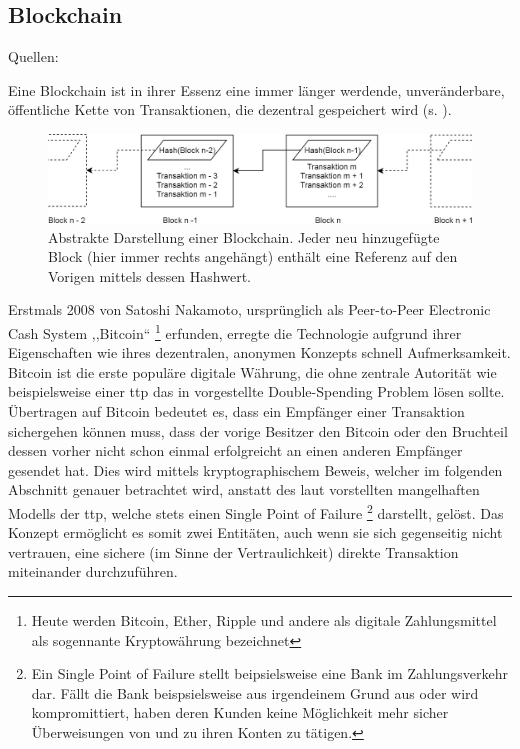 \subsection{Blockchain}
\label{sec:sota_blockchain}

    {\footnotesize Quellen: \cite{Dorri2016}\cite{Conoscenti2016}\cite{Greenspan2015}\cite{ISO307}\cite{Kshetri2017}\cite{Nakamoto2008}\cite{Underwood2016}\cite{Vukolic2016}\cite{Vukolic2017}\cite{Wuest2017}\cite{Zheng2017}}
    
    Eine Blockchain ist in ihrer Essenz eine immer länger werdende, unveränderbare, öffentliche Kette von Transaktionen, die dezentral gespeichert wird (s. ). 
    \smallskip
    \begin{figure}[H]
    	\centering
    	\includegraphics[width=\textwidth]{graphics/bc_highlvl.png}
    	\caption[Abstrakte Darstellung einer Blockchain]{Abstrakte Darstellung einer Blockchain. Jeder neu hinzugefügte Block (hier immer rechts angehängt) enthält eine Referenz auf den Vorigen mittels dessen Hashwert.}
    	\label{fig:bc_highlvl}
    \end{figure}
    \noindent Erstmals 2008 von Satoshi Nakamoto, ursprünglich als Peer-to-Peer Electronic Cash System ,,Bitcoin``
    \!\footnote{Heute werden Bitcoin, Ether, Ripple und andere als digitale Zahlungsmittel als sogennante Kryptowährung bezeichnet} 
    erfunden, erregte die Technologie aufgrund ihrer Eigenschaften wie ihres dezentralen, anonymen Konzepts schnell Aufmerksamkeit. 
    Bitcoin ist die erste populäre digitale Währung, die ohne zentrale Autorität wie beispielsweise einer \gls{ttp} das in  vorgestellte Double-Spending Problem lösen sollte\cite{Nakamoto2008}. 
    Übertragen auf Bitcoin bedeutet es, dass ein Empfänger einer Transaktion sichergehen können muss, dass der vorige Besitzer den Bitcoin oder den Bruchteil dessen vorher nicht schon einmal erfolgreicht an einen anderen Empfänger gesendet hat.
    Dies wird mittels kryptographischem Beweis, welcher im folgenden Abschnitt genauer betrachtet wird, anstatt des laut \citeauthor{Nakamoto2008} vorstellten mangelhaften Modells der \gls{ttp}, welche stets einen Single Point of Failure
    \!\footnote{Ein Single Point of Failure stellt beipsielsweise eine Bank im Zahlungsverkehr dar.
    Fällt die Bank beispsielsweise aus irgendeinem Grund aus oder wird kompromittiert, haben deren Kunden keine Möglichkeit mehr sicher Überweisungen von und zu ihren Konten zu tätigen.}
    darstellt, gelöst. 
    Das Konzept ermöglicht es somit zwei Entitäten, auch wenn sie sich gegenseitig nicht vertrauen, eine sichere (im Sinne der Vertraulichkeit) direkte Transaktion miteinander durchzuführen.
    
